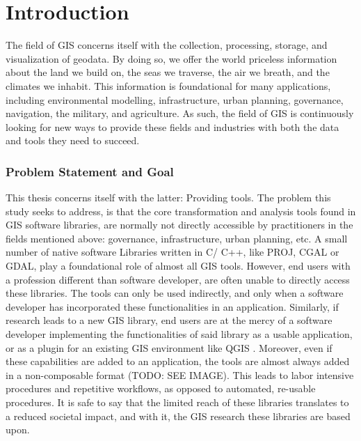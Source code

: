 \chapter{Introduction}
\label{chap:intro}

The field of \ac{GIS} concerns itself with the collection, processing, storage, and visualization of geodata. 
By doing so, we offer the world priceless information about the land we build on, the seas we traverse, the air we breath, and the climates we inhabit. 
This information is foundational for many applications, including environmental modelling, infrastructure, urban planning, governance, navigation, the military, and agriculture.   
As such, the field of \ac{GIS} is continuously looking for new ways to provide these fields and industries with both the data and tools they need to succeed. 

\subsection*{Problem Statement and Goal}

This thesis concerns itself with the latter: Providing tools. 
The problem this study seeks to address, is that the core transformation and analysis tools found in \ac{GIS} software libraries, are normally not directly accessible by practitioners in the fields mentioned above: governance, infrastructure, urban planning, etc.
A small number of native software Libraries written in C/ C++, like PROJ, CGAL or GDAL, play a foundational role of almost all \ac{GIS} tools. 
However, end users with a profession different than software developer, are often unable to directly access these libraries. 
The tools can only be used indirectly, and only when a software developer has incorporated these functionalities in an application. 
Similarly, if research leads to a new \ac{GIS} library, end users are at the mercy of a software developer implementing the functionalities of said library as a usable application, or as a plugin for an existing \ac{GIS} environment like QGIS \citep*{qgis_community_qgis_2022}.
Moreover, even if these capabilities are added to an application, the tools are almost always added in a non-composable format (TODO: SEE IMAGE). This leads to labor intensive procedures and repetitive workflows, as opposed to automated, re-usable procedures.
It is safe to say that the limited reach of these libraries translates to a reduced societal impact, and with it, the \ac{GIS} research these libraries are based upon.

